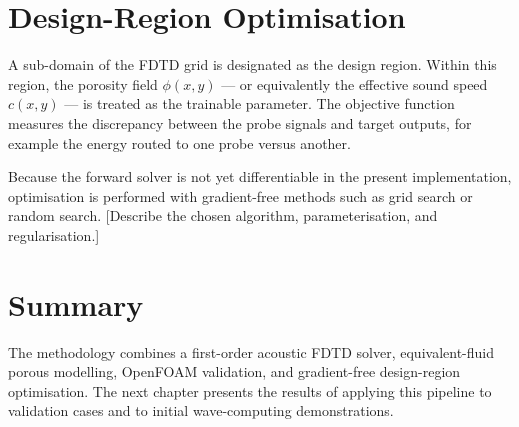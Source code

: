 \section{Design-Region Optimisation}
\label{sec:optimisation}

A sub-domain of the FDTD grid is designated as the design region. Within this region, the porosity field $\phi(x,y)$ --- or equivalently the effective sound speed $c(x,y)$ --- is treated as the trainable parameter. The objective function measures the discrepancy between the probe signals and target outputs, for example the energy routed to one probe versus another.

Because the forward solver is not yet differentiable in the present implementation, optimisation is performed with gradient-free methods such as grid search or random search. [Describe the chosen algorithm, parameterisation, and regularisation.]

\section{Summary}
\label{sec:meth_summary}

The methodology combines a first-order acoustic FDTD solver, equivalent-fluid porous modelling, OpenFOAM validation, and gradient-free design-region optimisation. The next chapter presents the results of applying this pipeline to validation cases and to initial wave-computing demonstrations.
